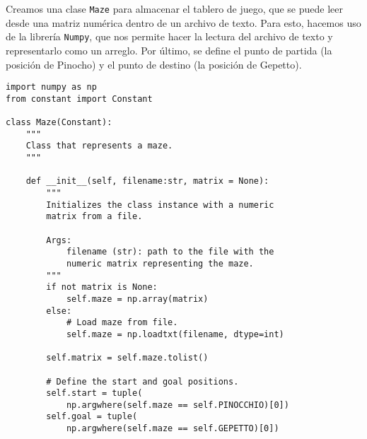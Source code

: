 Creamos una clase \lstinline{Maze} para almacenar el tablero de juego, que se puede leer desde una matriz numérica dentro de un archivo de texto. Para esto, hacemos uso de la librería \lstinline{Numpy}, que nos permite hacer la lectura del archivo de texto y representarlo como un arreglo. Por último, se define el punto de partida (la posición de Pinocho) y el punto de destino (la posición de Gepetto).\\
\begin{lstlisting}
import numpy as np
from constant import Constant

class Maze(Constant):
    """
    Class that represents a maze.
    """

    def __init__(self, filename:str, matrix = None):
        """
        Initializes the class instance with a numeric
        matrix from a file.

        Args:
            filename (str): path to the file with the
            numeric matrix representing the maze.
        """
        if not matrix is None:
            self.maze = np.array(matrix)
        else:
            # Load maze from file.
            self.maze = np.loadtxt(filename, dtype=int)
            
        self.matrix = self.maze.tolist()

        # Define the start and goal positions.
        self.start = tuple(
            np.argwhere(self.maze == self.PINOCCHIO)[0])
        self.goal = tuple(
            np.argwhere(self.maze == self.GEPETTO)[0])
\end{lstlisting}
